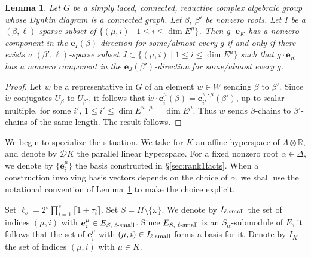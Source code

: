 \documentclass{amsart}
\theoremstyle{plain}
\newtheorem{lemma}[theorem]{Lemma}
\theoremstyle{definition}
\theoremstyle{remark}
\newcommand{\Vect}[1]{\mathbold{#1}}
\begin{document}
\begin{lemma}\label{lem:beta<->beta'}
Let $G$ be a simply laced, connected, reductive complex algebraic group whose Dynkin
diagram
is a connected graph. Let $\beta$, $\beta'$ be nonzero roots. Let $I$ be a $(\beta,
\ell)$-sparse subset of
$\{(\mu, i) \mid 1 \leqslant i \leqslant \dim E^{\mu}\}$.
Then $g \cdot \Vect{e}_{K}$ has a
nonzero component in the $\Vect{e}_{I}(\beta)$-direction for some/almost every $g$ if and
only if there exists a $(\beta',
\ell)$-sparse subset $J \subset
\{(\mu, i) \mid 1 \leqslant i \leqslant \dim E^{\mu}\}$ such that $g \cdot \Vect{e}_{K}$ has a nonzero component in
the $\Vect{e}_{J}(\beta')$-direction for some/almost every $g$.
\end{lemma}
\begin{proof}
Let $\dot{w}$ be a representative in $G$ of an element $w \in W$ sending $\beta$ to
$\beta'$. Since $\dot{w}$ conjugates $U_{\beta}$ to $U_{\beta'}$, it follows that
$\dot{w} \cdot \Vect{e}^{\mu}_{i}(\beta) = \Vect{e}^{w \cdot \mu}_{i'}(\beta')$,
up
to scalar multiple, for some
$i'$, $1 \leqslant i' \leqslant \dim E^{w \cdot \mu} = \dim E^{\mu}$. Thus $w$ sends $\beta$-chains to $\beta'$-chains of the same
length. The result follows.
\end{proof}

We begin to specialize the situation. We take for $K$ an
affine hyperspace of $\Lambda\otimes \mathbb{R}$, and denote by
$\mathscr{D}K$ the parallel linear hyperspace. For a fixed nonzero root $\alpha
\in \Delta$, we denote by $\{\Vect{e}^{\mu}_{i}\}$ the basis
constructed in \S\ref{sec:rank1facts}. When a construction involving basis vectors
depends on the choice of $\alpha$, we shall use the notational convention of Lemma~\ref{lem:beta<->beta'} to
make the choice explicit.

Set $\ell_{s} = 2^{s}\prod_{i = 1}^{s} \lceil 1 + \tau_{i} \rceil$. Set $S = \Pi
\setminus
\{\omega\}$. We denote by $I_{\textup{$\ell$-small}}$
the set of indices $(\mu, i)$ with $\Vect{e}^{\mu}_{i} \in E_{S, \textup{
$\ell$-small}}$. Since $E_{S, \textup{
$\ell$-small}}$ is an $S_{\alpha}$-submodule of $E$, it follows
that the set of $\Vect{e}^{\mu}_{i}$ with $(\mu, i) \in
I_{\textup{$\ell$-small}}$ forms a basis for it. Denote by $I_{K}$ the set of indices $(\mu, i)$ with $\mu \in K$.
\end{document}
